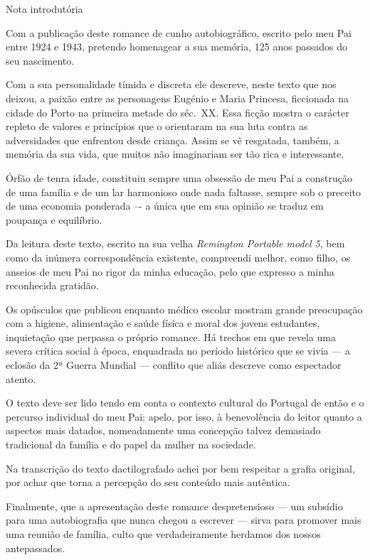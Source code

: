 \documentclass[9pt]{article}
\begin{document}
{\small
\begin{center}\sc\normalsize Nota introdutória\end{center}

Com a publica\-ção deste romance de cunho autobiográfico, escrito pelo meu Pai entre 1924 e 1943, pretendo homenagear a sua memória, 125 anos passados do seu nascimento.

Com a sua personalidade tímida e discreta ele descreve, neste texto que nos deixou, a paixão entre as personagens Eugénio e Maria Princesa, ficcionada na cidade do Porto na primeira metade do séc.\ XX. Essa fic\-ção mostra o carácter repleto de valores e princípios que o orientaram na sua luta contra as adversidades que enfrentou desde criança.
Assim se vê resgatada, também, a memória da sua vida, que muitos não imaginariam ser tão rica e interessante.

Órfão de tenra idade, constituiu sempre uma obsessão de meu Pai a constru\-ção de uma fa\-mí\-lia e de um lar harmonioso onde nada faltasse, sempre sob o preceito de uma economia ponderada –- a única que em sua opinião se traduz em poupan\-ça e equilíbrio.

Da leitura deste texto, escrito na sua ve\-lha \emph{Remington Portable model 5}, bem como da inúmera correspondên\-cia existente, compreendi me\-lhor, como fi\-lho, os anseios de meu Pai no rigor da minha educa\-ção, pelo que expresso a minha reconhecida gratidão.

Os opúsculos que publicou enquanto médico escolar mostram gran\-de preocupa\-ção com a higiene, alimenta\-ção e saúde física e moral dos jovens estudantes, inquieta\-ção que perpassa o próprio romance. Há trechos em que revela uma severa crítica social à época, enquadrada no período histórico que se vivia --- a eclosão da 2ª Guerra Mundial --- conflito que aliás descreve como espectador atento.

O texto deve ser lido tendo em conta o contexto cultural do Portugal de então e o percurso individual do meu Pai; apelo, por isso, à benevolência do leitor quanto a aspectos mais datados, nomeadamente uma concepção talvez demasiado tradicional da família e do papel da mulher na sociedade.

Na transcri\-ção do texto dactilografado achei por bem respeitar a grafia original, por achar que torna a percep\-ção do seu conteúdo mais autêntica.

Finalmente, que a apresenta\-ção deste romance despretensioso --- um subsí\-dio para uma autobiografia que nunca chegou a escrever --- sirva para promover mais uma reunião de fa\-mí\-lia, culto que verdadeiramente herdamos dos nossos antepassados.

}
\end{document}
